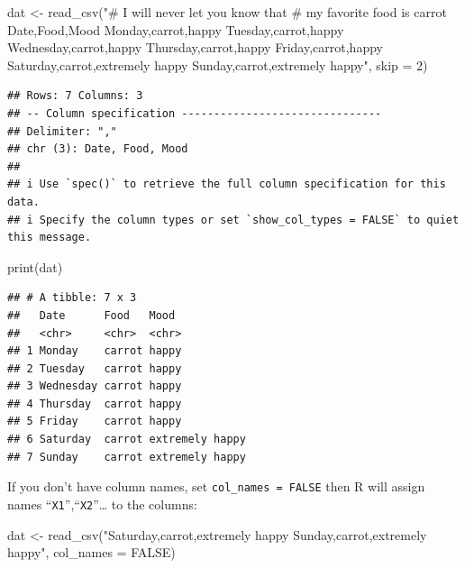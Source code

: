 \documentclass[
  12pt,
]{krantz}
\makeatletter
\newenvironment{Shaded}{\begin{snugshade}}{\end{snugshade}}
\newcommand{\AttributeTok}[1]{\textcolor[rgb]{0.61,0.61,0.61}{#1}}
\newcommand{\ConstantTok}[1]{\textcolor[rgb]{0,0,0}{#1}}
\newcommand{\DecValTok}[1]{\textcolor[rgb]{0.06,0.06,0.06}{#1}}
\newcommand{\FunctionTok}[1]{\textcolor[rgb]{0,0,0}{#1}}
\newcommand{\NormalTok}[1]{#1}
\newcommand{\OtherTok}[1]{\textcolor[rgb]{0.37,0.37,0.37}{#1}}
\newcommand{\StringTok}[1]{\textcolor[rgb]{0.5,0.5,0.5}{#1}}
\newenvironment{kframe}{%
\medskip{}
\setlength{\fboxsep}{.8em}
 \def\at@end@of@kframe{}%
 \ifinner\ifhmode%
  \def\at@end@of@kframe{\end{minipage}}%
  \begin{minipage}{\columnwidth}%
 \fi\fi%
 \def\FrameCommand##1{\hskip\@totalleftmargin \hskip-\fboxsep
 \colorbox{shadecolor}{##1}\hskip-\fboxsep
     \hskip-\linewidth \hskip-\@totalleftmargin \hskip\columnwidth}%
 \MakeFramed {\advance\hsize-\width
   \@totalleftmargin\z@ \linewidth\hsize
   \@setminipage}}%
 {\par\unskip\endMakeFramed%
 \at@end@of@kframe}
\renewenvironment{Shaded}{\begin{kframe}}{\end{kframe}}
\makeatother
\begin{document}
\begin{Shaded}
\begin{Highlighting}[]
\NormalTok{dat }\OtherTok{\textless{}{-}} \FunctionTok{read\_csv}\NormalTok{(}\StringTok{"\# I will never let you know that}
\StringTok{          \# my favorite food is carrot}
\StringTok{          Date,Food,Mood}
\StringTok{          Monday,carrot,happy}
\StringTok{          Tuesday,carrot,happy}
\StringTok{          Wednesday,carrot,happy}
\StringTok{          Thursday,carrot,happy}
\StringTok{          Friday,carrot,happy}
\StringTok{          Saturday,carrot,extremely happy}
\StringTok{          Sunday,carrot,extremely happy"}\NormalTok{, }
          \AttributeTok{skip =} \DecValTok{2}\NormalTok{)}
\end{Highlighting}
\end{Shaded}

\begin{verbatim}
## Rows: 7 Columns: 3
## -- Column specification -------------------------------
## Delimiter: ","
## chr (3): Date, Food, Mood
## 
## i Use `spec()` to retrieve the full column specification for this data.
## i Specify the column types or set `show_col_types = FALSE` to quiet this message.
\end{verbatim}

\begin{Shaded}
\begin{Highlighting}[]
\FunctionTok{print}\NormalTok{(dat)}
\end{Highlighting}
\end{Shaded}

\begin{verbatim}
## # A tibble: 7 x 3
##   Date      Food   Mood           
##   <chr>     <chr>  <chr>          
## 1 Monday    carrot happy          
## 2 Tuesday   carrot happy          
## 3 Wednesday carrot happy          
## 4 Thursday  carrot happy          
## 5 Friday    carrot happy          
## 6 Saturday  carrot extremely happy
## 7 Sunday    carrot extremely happy
\end{verbatim}

If you don't have column names, set \texttt{col\_names\ =\ FALSE} then R will assign names ``\texttt{X1}'',``\texttt{X2}''\ldots{} to the columns:

\begin{Shaded}
\begin{Highlighting}[]
\NormalTok{dat }\OtherTok{\textless{}{-}} \FunctionTok{read\_csv}\NormalTok{(}\StringTok{"Saturday,carrot,extremely happy}
\StringTok{          Sunday,carrot,extremely happy"}\NormalTok{, }\AttributeTok{col\_names =} \ConstantTok{FALSE}\NormalTok{)}
\end{Highlighting}
\end{Shaded}
\end{document}
